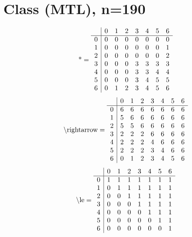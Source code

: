 \documentclass[11pt]{article}
\begin{document}
\section{Class (MTL), n=190}
\[\text{*} = 
\begin{array}{r | r r r r r r r}
 & 0 & 1 & 2 & 3 & 4 & 5 & 6 \\ \hline
0 & 0 & 0 & 0 & 0 & 0 & 0 & 0 \\
1 & 0 & 0 & 0 & 0 & 0 & 0 & 1 \\
2 & 0 & 0 & 0 & 0 & 0 & 0 & 2 \\
3 & 0 & 0 & 0 & 3 & 3 & 3 & 3 \\
4 & 0 & 0 & 0 & 3 & 3 & 4 & 4 \\
5 & 0 & 0 & 0 & 3 & 4 & 5 & 5 \\
6 & 0 & 1 & 2 & 3 & 4 & 5 & 6 \\
\end{array}
\]
\[\text{\textbackslash rightarrow} = 
\begin{array}{r | r r r r r r r}
 & 0 & 1 & 2 & 3 & 4 & 5 & 6 \\ \hline
0 & 6 & 6 & 6 & 6 & 6 & 6 & 6 \\
1 & 5 & 6 & 6 & 6 & 6 & 6 & 6 \\
2 & 5 & 5 & 6 & 6 & 6 & 6 & 6 \\
3 & 2 & 2 & 2 & 6 & 6 & 6 & 6 \\
4 & 2 & 2 & 2 & 4 & 6 & 6 & 6 \\
5 & 2 & 2 & 2 & 3 & 4 & 6 & 6 \\
6 & 0 & 1 & 2 & 3 & 4 & 5 & 6 \\
\end{array}
\]
\[\text{\textbackslash le} = 
\begin{array}{r | r r r r r r r}
 & 0 & 1 & 2 & 3 & 4 & 5 & 6 \\ \hline
0 & 1 & 1 & 1 & 1 & 1 & 1 & 1 \\
1 & 0 & 1 & 1 & 1 & 1 & 1 & 1 \\
2 & 0 & 0 & 1 & 1 & 1 & 1 & 1 \\
3 & 0 & 0 & 0 & 1 & 1 & 1 & 1 \\
4 & 0 & 0 & 0 & 0 & 1 & 1 & 1 \\
5 & 0 & 0 & 0 & 0 & 0 & 1 & 1 \\
6 & 0 & 0 & 0 & 0 & 0 & 0 & 1 \\
\end{array}
\]
\end{document}

